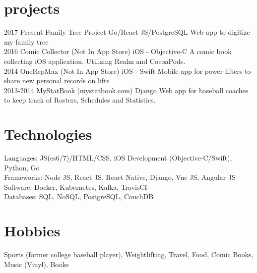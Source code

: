 \documentclass[]{friggeri-cv} %
\begin{document}

\section{projects}

\begin{entrylist}
\entry
{2017-Present}
{Family Tree Project}
{Go/React JS/PostgreSQL}
{Web app to digitize my family tree}\\

\entry
{2016}
{Comic Collector (Not In App Store)}
{iOS - Objective-C}
{A comic book collecting iOS application. Utilizing Realm and CocoaPods.}\\

\entry
{2014}
{OneRepMax (Not In App Store)}
{iOS - Swift}
{Mobile app for power lifters to share new personal records on lifts}\\

\entry
{2013-2014}
{MyStatBook (mystatbook.com)}
{Django}
{Web app for baseball coaches to keep track of Rosters, Schedules and Statistics.}\\

\end{entrylist}


\section{Technologies}
{Languages: JS(es6/7)/HTML/CSS, iOS Development (Objective-C/Swift), Python, Go} \\
{Frameworks: Node JS, React JS, React Native, Django, Vue JS, Angular JS} \\
{Software: Docker, Kubernetes, Kafka, TravisCI} \\
{Databases: SQL, NoSQL, PostgreSQL, CouchDB} \\

\section{Hobbies}
Sports (former college baseball player), Weightlifting, Travel, Food, Comic Books, Music (Vinyl), Books
\end{document}
